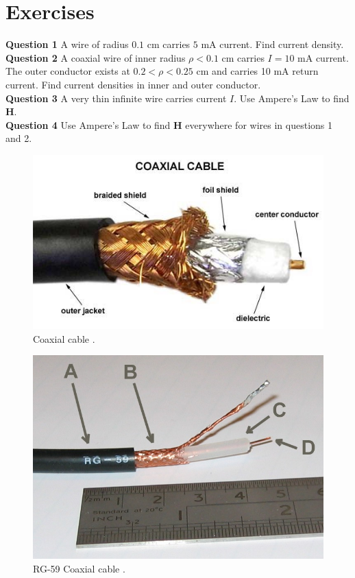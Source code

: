 \documentclass[12pt,a4paper]{article}
\begin{document}
\section{Exercises}
\noindent\textbf{Question 1} A wire of radius $0.1$ cm carries $5$ mA current. Find current density.\\[0.2cm]
\noindent\textbf{Question 2} A coaxial wire of inner radius $\rho<0.1$ cm carries $I=10$ mA current. The outer conductor exists at $0.2<\rho<0.25$ cm and carries 10 mA return current. Find current densities in inner and outer conductor.\\[0.2cm]
\noindent\textbf{Question 3} A very thin infinite wire carries current $I$. Use Ampere's Law to find \textbf{H}.\\[0.2cm]
\noindent\textbf{Question 4} Use Ampere's Law to find \textbf{H} everywhere for wires in questions 1 and 2.\\[0.2cm]
\begin{minipage}{0.5\textwidth}
\begin{figure}[H]
\centering
\includegraphics[scale=0.45]{CoaxialCable01.jpg}
\caption{Coaxial cable \cite{Ref:CoaxialCable01}.}
\label{Coaxial-cable}
\end{figure}
\end{minipage}
\begin{minipage}{0.5\textwidth}
\begin{figure}[H]
\centering
\includegraphics[scale=0.325]{CoaxialCable02.jpg}
\caption{RG-59 Coaxial cable \cite{Ref:CoaxialCable02}.}
\label{Coaxial-cable-rg59}
\end{figure}
\end{minipage}


\end{document}
